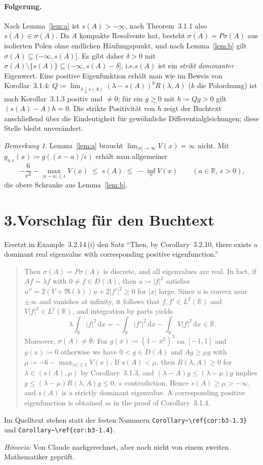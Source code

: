 \documentclass[11pt,a4paper]{article}
\theoremstyle{plain}
\theoremstyle{remark}
\newtheorem*{bemerkung}{Bemerkung}
\newcommand{\R}{\mathbb{R}}
\newcommand{\dx}{\,\mathrm{d}x}
\newcommand{\ie}{i.e.}
\begin{document}
\paragraph{Folgerung.}
Nach Lemma~\ref{lem:a} ist $s(A) > -\infty$, nach Theorem~3.1.1 also $s(A) \in \sigma(A)$. Da $A$ kompakte Resolvente hat, besteht $\sigma(A) = P\sigma(A)$ aus isolierten Polen ohne endlichen Häufungspunkt, und nach Lemma~\ref{lem:b} gilt $\sigma(A) \subseteq (-\infty, s(A)]$. Es gibt daher $\delta > 0$ mit $\sigma(A) \setminus \{s(A)\} \subseteq (-\infty, s(A) - \delta]$, \ie $s(A)$ ist ein \emph{strikt dominanter} Eigenwert. Eine positive Eigenfunktion erhält man wie im Beweis von Korollar~3.1.4: $Q \coloneq \lim_{\lambda\downarrow s(A)} (\lambda - s(A))^k R(\lambda,A)$ ($k$ die Polordnung) ist nach Korollar~3.1.3 positiv und $\neq 0$; für ein $g \geq 0$ mit $h \coloneq Qg > 0$ gilt $(s(A) - A)h = 0$. Die strikte Positivität von $h$ zeigt der Buchtext anschließend über die Eindeutigkeit für gewöhnliche Differentialgleichungen; diese Stelle bleibt unverändert.

\begin{bemerkung}
Lemma~\ref{lem:a} braucht $\lim_{|x|\to\infty}V(x) = \infty$ nicht. Mit $g_{a,\epsilon}(x) \coloneq g((x-a)/\epsilon)$ erhält man allgemeiner
\[
  -\frac{6}{\epsilon^2} - \max_{|x-a| \leq \epsilon} V(x) \;\leq\; s(A) \;\leq\; -\inf_x V(x) \qquad (a \in \R,\ \epsilon > 0),
\]
die obere Schranke aus Lemma~\ref{lem:b}.
\end{bemerkung}

\section*{3.\quad Vorschlag für den Buchtext}

Ersetzt in Example~3.2.14\,(i) den Satz \enquote{Then, by Corollary~3.2.10, there exists a dominant real eigenvalue with corresponding positive eigenfunction.}

\begin{quote}
Then $\sigma(A) = P\sigma(A)$ is discrete, and all eigenvalues are real.
In fact, if $Af = \lambda f$ with $0 \neq f \in D(A)$, then $u \coloneq |f|^{2}$ satisfies $u'' = 2(V + \Re(\lambda))u + 2|f'|^{2} \geq 0$ for $|x|$ large.
Since $u$ is convex near $\pm\infty$ and vanishes at infinity, it follows that $f, f' \in L^{2}(\R)$ and $V|f|^{2} \in L^{1}(\R)$, and integration by parts yields
\[
  \lambda \int_{\R} |f|^{2} \dx = -\int_{\R} |f'|^{2} \dx - \int_{\R} V|f|^{2} \dx \in \R .
\]
Moreover, $\sigma(A) \neq \emptyset$:
For $g(x) \coloneq (1-x^{2})^{3}$ on $[-1,1]$ and $g(x) \coloneq 0$ otherwise we have $0 < g \in D(A)$ and $Ag \geq \mu g$ with $\mu \coloneq -6 - \max_{|x| \leq 1} V(x)$.
If $s(A) < \mu$, then $R(\lambda,A) \geq 0$ for $\lambda \in (s(A),\mu)$ by Corollary~3.1.3, and $(\lambda - A)g \leq (\lambda - \mu)g$ implies $g \leq (\lambda-\mu)R(\lambda,A)g \leq 0$, a contradiction.
Hence $s(A) \geq \mu > -\infty$, and $s(A)$ is a strictly dominant eigenvalue.
A corresponding positive eigenfunction is obtained as in the proof of Corollary~3.1.4.
\end{quote}

Im Quelltext stehen statt der festen Nummern \verb|Corollary~\ref{cor:b3-1.3}| und \verb|Corollary~\ref{cor:b3-1.4}|.

\vspace{1ex}
\noindent\emph{Hinweis:} Von Claude nachgerechnet, aber noch nicht von einem zweiten Mathematiker geprüft.
\end{document}
